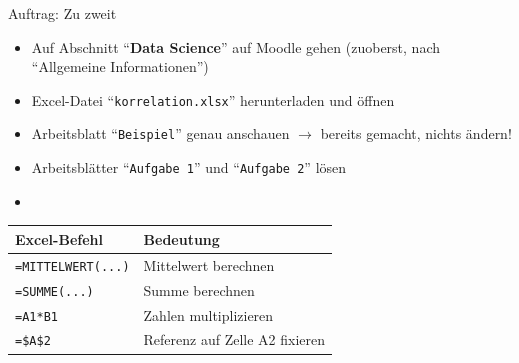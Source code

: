 \begin{frame}[fragile]{Auftrag: Zu zweit}
    \begin{itemize}
        \item Auf Abschnitt ``\textbf{Data Science}'' auf Moodle gehen (zuoberst, nach ``Allgemeine Informationen'')
        \item Excel-Datei ``\texttt{korrelation.xlsx}'' herunterladen und öffnen
        \item Arbeitsblatt ``\texttt{Beispiel}'' genau anschauen $\rightarrow$ bereits gemacht, nichts ändern!
        \item Arbeitsblätter ``\texttt{Aufgabe 1}'' und ``\texttt{Aufgabe 2}'' lösen
        \item {}
    \end{itemize}

    \begin{table}[H]
        \centering
        \begin{tabular}{l|l}
            \textbf{Excel-Befehl}   & \textbf{Bedeutung}             \\\midrule\midrule
            \verb|=MITTELWERT(...)| & Mittelwert berechnen           \\\midrule
            \verb|=SUMME(...)|      & Summe berechnen                \\\midrule
            \verb|=A1*B1|           & Zahlen multiplizieren          \\\midrule
            \verb|=$A$2|            & Referenz auf Zelle A2 fixieren \\
        \end{tabular}
    \end{table}
\end{frame}

